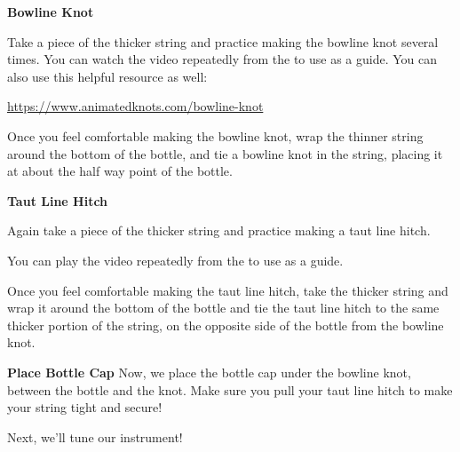 \documentclass[12pt,noauthor,nooutcomes,instructornotes]{ximera}
\begin{document}
\begin{question}
\textbf{Bowline Knot}

Take a piece of the thicker string and practice making the bowline knot several times.  You can watch the video repeatedly from the  to use as a guide.  You can also use this helpful resource as well:

\url{https://www.animatedknots.com/bowline-knot}

Once you feel comfortable making the bowline knot, wrap the thinner string around the bottom of the bottle, and tie a bowline knot in the string, placing it at about the half way point of the bottle.

\end{question}

\begin{question}
\textbf{Taut Line Hitch}

Again take a piece of the thicker string and practice making a taut line hitch.  

\begin{instructorNotes}
You can play the video repeatedly from the  to use as a guide. 
\end{instructorNotes}
 

Once you feel comfortable making the taut line hitch, take the thicker string and wrap it around the bottom of the bottle and tie the taut line hitch to the same thicker portion of the string, on the opposite side of the bottle from the bowline knot.
\end{question}

\begin{question}
\textbf{Place Bottle Cap}
Now, we place the bottle cap under the bowline knot, between the bottle and the knot.  Make sure you pull your taut line hitch to make your string tight and secure!
\end{question}

Next, we'll tune our instrument!
\end{document}
